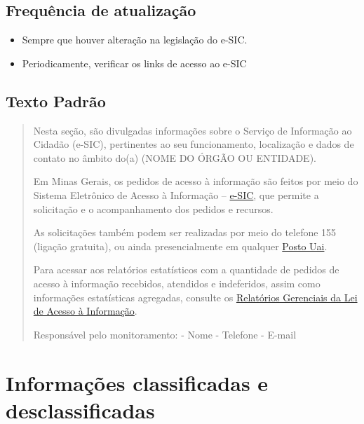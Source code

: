 \documentclass[
]{book}
\providecommand{\tightlist}{%
  \setlength{\itemsep}{0pt}\setlength{\parskip}{0pt}}
\begin{document}
\hypertarget{frequuxeancia-de-atualizauxe7uxe3o}{%
\subsection{Frequência de atualização}\label{frequuxeancia-de-atualizauxe7uxe3o}}

\begin{itemize}
\tightlist
\item
  Sempre que houver alteração na legislação do e-SIC.
\item
  Periodicamente, verificar os links de acesso ao e-SIC
\end{itemize}

\hypertarget{texto-padruxe3o-1}{%
\subsection{Texto Padrão}\label{texto-padruxe3o-1}}

\begin{quote}
Nesta seção, são divulgadas informações sobre o Serviço de Informação ao Cidadão (e-SIC), pertinentes ao seu funcionamento, localização e dados de contato no âmbito do(a) (NOME DO ÓRGÃO OU ENTIDADE).

Em Minas Gerais, os pedidos de acesso à informação são feitos por meio do Sistema Eletrônico de Acesso à Informação -- \href{http://www.acessoainformacao.mg.gov.br}{e-SIC}, que permite a solicitação e o acompanhamento dos pedidos e recursos.

As solicitações também podem ser realizadas por meio do telefone 155 (ligação gratuita), ou ainda presencialmente em qualquer \href{http://www.planejamento.mg.gov.br/canais-de-atendimento-ao-cidadao/uais-unidades-de-atendimento-integrado/enderecos-das-uais}{Posto Uai}.

Para acessar aos relatórios estatísticos com a quantidade de pedidos de acesso à informação recebidos, atendidos e indeferidos, assim como informações estatísticas agregadas, consulte os \href{http://www.transparencia.mg.gov.br/o-que-e\#relatórios-gerenciais-–-lei-de-acesso-à-informação}{Relatórios Gerenciais da Lei de Acesso à Informação}.

Responsável pelo monitoramento:
- Nome
- Telefone
- E-mail
\end{quote}

\hypertarget{informauxe7uxf5es-classificadas-e-desclassificadas}{%
\section{Informações classificadas e desclassificadas}\label{informauxe7uxf5es-classificadas-e-desclassificadas}}
\end{document}

